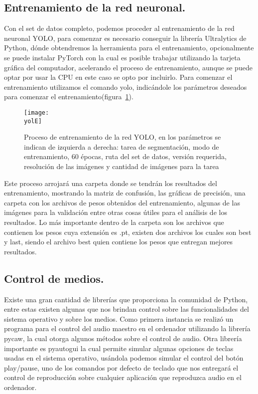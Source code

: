 \documentclass[a4paper, 12pt]{article}
\newcommand{\yolE}{img/yolo_comand.png}
\begin{document}
	\subsection{Entrenamiento de la red neuronal.}
	Con el set de datos completo, podemos proceder al entrenamiento de la red neuronal YOLO, para comenzar es necesario conseguir la librería Ultralytics de Python, dónde obtendremos la herramienta para el entrenamiento, opcionalmente se puede instalar PyTorch con la cual es posible trabajar utilizando la tarjeta gráfica del computador, acelerando el proceso de entrenamiento, aunque se puede optar por usar la CPU en este caso se opto por incluirlo. Para comenzar el entrenamiento utilizamos el comando yolo, indicándole los parámetros deseados para comenzar el entrenamiento(figura~\ref{fig:yolo_train}).
	
	\begin{figure}[H]
		\centering
		\texttt{[image: \\yolE]}
		\caption{Proceso de entrenamiento de la red YOLO, en los parámetros se indican de izquierda a derecha: tarea de segmentación, modo de entrenamiento, 60 épocas, ruta del set de datos, versión requerida, resolución de las imágenes y cantidad de imágenes para la tarea}
		\label{fig:yolo_train}
	\end{figure}

	Este proceso arrojará una carpeta donde se tendrán los resultados del entrenamiento, mostrando la matriz de confusión, las gráficas de precisión, una carpeta con los archivos de pesos obtenidos del entrenamiento, algunas de las imágenes para la validación entre otras cosas útiles para el análisis de los resultados. Lo más importante dentro de la carpeta son los archivos que contienen los pesos cuya extensión es .pt, existen dos archivos los cuales son best y last, siendo el archivo best quien contiene los pesos que entregan mejores resultados. 

	\subsection{Control de medios.}
	Existe una gran cantidad de librerías que proporciona la comunidad de Python, entre estas existen algunas que nos brindan control sobre las funcionalidades del sistema operativo y sobre los medios. Como primera instancia se realizó un programa para el control del audio maestro en el ordenador utilizando la librería pycaw, la cual otorga algunos métodos sobre el control de audio. Otra librería importante es pyautogui la cual permite simular algunas opciones de teclas usadas en el sistema operativo, usándola podemos simular el control del botón play/pause, uno de los comandos por defecto de teclado que nos entregará el control de reproducción sobre cualquier aplicación que reproduzca audio en el ordenador.
    
\end{document}
